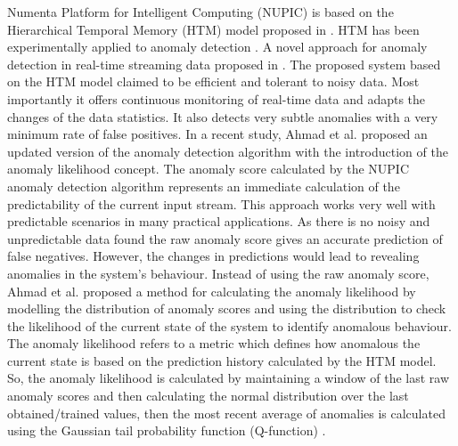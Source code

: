 \documentclass[sigconf]{acmart}
\begin{document}
 Numenta Platform for Intelligent Computing (NUPIC) is based on the Hierarchical Temporal Memory (HTM) model proposed in \cite{Hawkins:2007fi}. HTM has been experimentally applied to anomaly detection \cite{DBLP:journals/corr/LavinA15,DBLP:journals/corr/AhmadP16}.
A novel approach for anomaly detection  in real-time streaming data proposed in \cite{DBLP:journals/corr/AhmadP16,DBLP:journals/corr/LavinA15}. The proposed system based on the HTM model claimed to be efficient and tolerant to noisy data. Most importantly it offers continuous monitoring of real-time data and adapts the changes of the data statistics. It also detects very subtle anomalies with a very minimum rate of false positives. In a recent study, Ahmad et al. \cite{AHMAD2017134} proposed an updated version of the anomaly detection algorithm with the introduction of the anomaly likelihood concept. 
The anomaly score calculated by the NUPIC anomaly detection algorithm represents an immediate calculation of the predictability of the current input stream. This approach works very well with predictable scenarios in many practical applications. As there is no noisy and unpredictable data found the raw anomaly score gives an accurate prediction of false negatives. However, the changes in predictions would lead to revealing anomalies in the system’s behaviour. Instead of using the raw anomaly score, Ahmad et al. \cite{AHMAD2017134} proposed a method for calculating the anomaly likelihood by modelling the distribution of anomaly scores and using the distribution to check the likelihood of the current state of the system to identify anomalous behaviour. The anomaly likelihood refers to a metric which defines how anomalous the current state is based on the prediction history calculated by the HTM model. So, the anomaly likelihood is calculated by maintaining a window of the last raw anomaly scores and then calculating the normal distribution over the last obtained/trained values, then the most recent average of anomalies is calculated using the Gaussian tail probability function (Q-function) \cite{craig1991new}.
\end{document}
